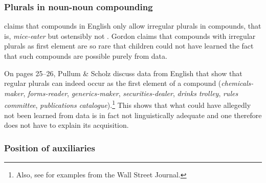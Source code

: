\subsubsection{Plurals in noun-noun compounding}

\mbox{}\citet{Gordon85a} claims that compounds in English only allow
irregular plurals in compounds, that is, \emph{mice-eater} but ostensibly not
. Gordon claims that compounds with irregular plurals as first element are so rare that children could not have learned the fact that such
compounds are possible purely from data.

On pages 25--26, Pullum \& Scholz discuss data from English that show that regular plurals can
indeed occur as the first element of a compound (\emph{chemicals-maker}, \emph{forms-reader}, \emph{generics-maker},
\emph{securities-dealer}, \emph{drinks trolley}, \emph{rules committee}, \emph{publications
  catalogue}).\footnote{%
  Also, see  for examples from the Wall Street Journal.
}
This shows that what could have allegedly not been learned from data is in fact not linguistically adequate and one therefore does not have to explain 
its acquisition.

\subsubsection{Position of auxiliaries}


